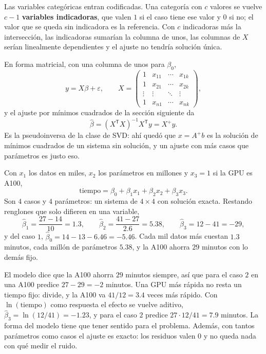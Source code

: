 \documentclass[11pt,letterpaper]{article}
\begin{document}
Las variables categóricas entran codificadas. Una categoría con $c$
valores se vuelve $c - 1$ \textbf{variables indicadoras}, que valen $1$
si el caso tiene ese valor y $0$ si no; el valor que se queda sin
indicadora es la referencia. Con $c$ indicadoras más la intersección,
las indicadoras sumarían la columna de unos, las columnas de $X$
serían linealmente dependientes y el ajuste no tendría solución única.

En forma matricial, con una columna de unos para $\beta_0$,
\[
    y = X\beta + \varepsilon ,
    \qquad
    X = \begin{pmatrix}
            1 & x_{11} & \cdots & x_{1k} \\
            1 & x_{21} & \cdots & x_{2k} \\
            \vdots & \vdots & \ddots & \vdots \\
            1 & x_{n1} & \cdots & x_{nk}
        \end{pmatrix} ,
\]
y el ajuste por mínimos cuadrados de la sección siguiente da
\[
    \hat{\beta} = (X^{\mathsf{T}} X)^{-1} X^{\mathsf{T}} y = X^{+} y .
\]
Es la pseudoinversa de la clase de SVD: ahí quedó que $x = A^{+}b$ es
la solución de mínimos cuadrados de un sistema sin solución, y un
ajuste con más casos que parámetros es justo eso.

\begin{ejemplo}
    Con $x_1$ los datos en miles, $x_2$ los parámetros en millones y
    $x_3 = 1$ si la GPU es A100,
    \[
        \text{tiempo} = \beta_0 + \beta_1 x_1 + \beta_2 x_2
                        + \beta_3 x_3 .
    \]
    Son $4$ casos y $4$ parámetros: un sistema de $4 \times 4$ con
    solución exacta. Restando renglones que solo difieren en una
    variable,
    \[
        \hat{\beta}_1 = \frac{27 - 14}{10} = 1.3 ,
        \qquad
        \hat{\beta}_2 = \frac{41 - 27}{2.6} = 5.38 ,
        \qquad
        \hat{\beta}_3 = 12 - 41 = -29 ,
    \]
    y del caso $1$, $\hat{\beta}_0 = 14 - 13 - 6.46 = -5.46$. Cada mil
    datos más cuestan $1.3$ minutos, cada millón de parámetros $5.38$,
    y la A100 ahorra $29$ minutos con lo demás fijo.
\end{ejemplo}

\begin{ojo}
    El modelo dice que la A100 ahorra $29$ minutos siempre, así que
    para el caso $2$ en una A100 predice $27 - 29 = -2$ minutos. Una
    GPU más rápida no resta un tiempo fijo: divide, y la A100 va
    $41 / 12 = 3.4$ veces más rápido. Con $\ln(\text{tiempo})$ como
    respuesta el efecto se vuelve aditivo,
    $\hat{\beta}_3 = \ln(12 / 41) = -1.23$, y para el caso $2$ predice
    $27 \cdot 12 / 41 = 7.9$ minutos. La forma del modelo tiene que
    tener sentido para el problema. Además, con tantos parámetros como
    casos el ajuste es exacto: los residuos valen $0$ y no queda nada
    con qué medir el ruido.
\end{ojo}
\end{document}
